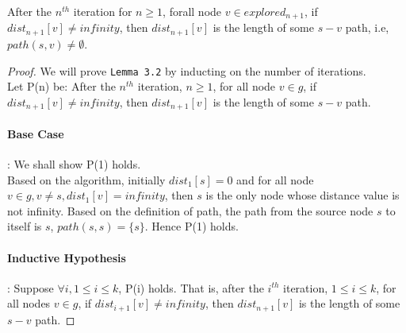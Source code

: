 \begin{sublemma}
After the $n^{th}$ iteration for $n \geq 1$, forall node $v \in explored_{n+1}$, if $dist_{n+1}[v] \neq infinity$, then $dist_{n+1}[v]$ is the length of some $s-v$ path, i.e, $path(s, v) \neq \emptyset$.  
\end{sublemma}
\begin{proof}
We will prove \texttt{Lemma 3.2} by inducting on the number of iterations. 
\\
Let P(n) be: After the $n^{th}$ iteration, $n \geq 1$, for all node $v \in g$, if $dist_{n+1}[v] \neq infinity$, then $dist_{n+1}[v]$ is the length of some $s-v$ path. 

\paragraph*{Base Case}: We shall show P(1) holds. 
\\
Based on the algorithm, initially $dist_1[s] = 0$ and for all node $v \in g, v \neq s, dist_1[v] = infinity$, then $s$ is the only node whose distance value is not infinity. Based on the definition of path, the path from the source node $s$ to itself is $s$, $path(s, s) = \{s\}$. Hence P(1) holds. 
\paragraph*{Inductive Hypothesis}: Suppose $\forall i, 1 \leq i \leq k$, P(i) holds. That is, after the $i^{th}$ iteration, $1 \leq i \leq k$, for all nodes $v \in g$, if $dist_{i+1}[v] \neq infinity$, then $dist_{n+1}[v]$ is the length of some $s-v$ path. 


\end{proof}

